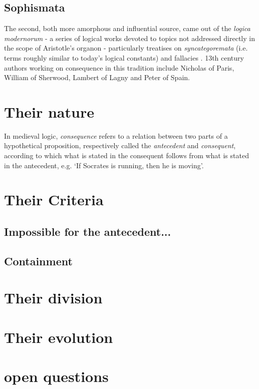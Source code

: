 \documentclass[]{article}
\begin{document}
\subsection{Sophismata}
The second, both more amorphous and influential source, 
came out of the \emph{logica modernorum} 
- a series of logical works devoted to topics not addressed directly in the scope of Aristotle's organon 
- particularly treatises on 
\emph{syncategoremata} (i.e. terms roughly similar to today's logical constants) 
and fallacies
\autocite{Green-Pedersen1984,Spruyt2018}.
13th century authors working on consequence in this tradition include 
Nicholas of Paris, 
William of Sherwood, 
Lambert of Lagny 
and Peter of Spain.

\section{Their nature}
In medieval logic, 
\emph{consequence} refers to a relation between two parts of a hypothetical proposition, 
respectively called the \emph{antecedent} and \emph{consequent}, 
according to which what is stated in the consequent follows from what is stated in the antecedent, 
e.g. `If Socrates is running, then he is moving'. 
\section{Their Criteria}

\subsection{Impossible for the antecedent...}

\subsection{Containment}

\section{Their division}


\section{Their evolution}

\section{open questions}

\printbibliography
\end{document}
